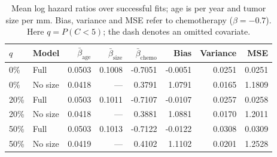 \begin{table}[htbp]
\centering
\small
\setlength{\tabcolsep}{4pt}
\begin{tabular}{llrrrrrr}
\toprule
$q$ & Model & $\bar\beta_{\mathrm{age}}$ & $\bar\beta_{\mathrm{size}}$ & $\bar\beta_{\mathrm{chemo}}$ & Bias & Variance & MSE \\
\midrule
0\% & Full & 0.0503 & 0.1008 & -0.7051 & -0.0051 & 0.0251 & 0.0251 \\
0\% & No size & 0.0418 & --- & 0.3791 & 1.0791 & 0.0165 & 1.1809 \\
20\% & Full & 0.0503 & 0.1011 & -0.7107 & -0.0107 & 0.0257 & 0.0258 \\
20\% & No size & 0.0418 & --- & 0.3881 & 1.0881 & 0.0170 & 1.2011 \\
50\% & Full & 0.0503 & 0.1013 & -0.7122 & -0.0122 & 0.0308 & 0.0309 \\
50\% & No size & 0.0419 & --- & 0.4102 & 1.1102 & 0.0201 & 1.2528 \\
\bottomrule
\end{tabular}
\caption{Mean log hazard ratios over successful fits; age is per year and
tumor size per mm. Bias, variance and MSE refer to chemotherapy
($\beta=-0.7$). Here $q=P(C<5)$; the dash denotes an omitted covariate.}
\label{tab:part3_coefficients}
\end{table}
